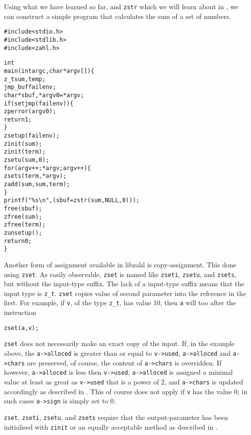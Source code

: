 Using what we have learned so far, and {\tt zstr}
which we will learn about in ,
we can construct a simple program that calculates the
sum of a set of numbers.

\begin{alltt}
   \textcolor{c}{#include <stdio.h>
   #include <stdlib.h>
   #include <zahl.h>}

   int
   main(int argc, char *argv[]) \{
       z_t sum, temp;
       \textcolor{c}{jmp_buf failenv;
       char *sbuf, *argv0 = *argv;
       if (setjmp(failenv)) \{
           zperror(argv0);
           return 1;
       \}
       zsetup(failenv);
       zinit(sum);
       zinit(term);}
       zsetu(sum, 0);
       for (argv++; *argv; argv++) \{
           zsets(term, *argv);
           zadd(sum, sum, term);
       \}
       \textcolor{c}{printf("\%s\textbackslash{}n", (sbuf = zstr(sum, NULL, 0)));
       free(sbuf);
       zfree(sum);
       zfree(term);
       zunsetup();
       return 0;}
   \}
\end{alltt}

Another form of assignment available in libzahl is
copy-assignment. This done using {\tt zset}. As
easily observable, {\tt zset} is named like
{\tt zseti}, {\tt zsetu}, and {\tt zsets}, but
without the input-type suffix. The lack of a
input-type suffix means that the input type is
{\tt z\_t}. {\tt zset} copies value of second
parameter into the reference in the first. For
example, if {\tt v}, of the type {\tt z\_t}, has
value 10, then {\tt a} will too after the instruction

\begin{alltt}
   zset(a, v);
\end{alltt}

{\tt zset} does not necessarily make an exact
copy of the input. If, in the example above, the
{\tt a->alloced} is greater than or equal to
{\tt v->used}, {\tt a->alloced} and {\tt a->chars}
are preserved, of course, the content of
{\tt a->chars} is overridden. If however,
{\tt a->alloced} is less then {\tt v->used},
{\tt a->alloced} is assigned a minimal value at
least as great as {\tt v->used} that is a power
of 2, and {\tt a->chars} is updated accordingly
as described in .
This of course does not apply if {\tt v} has the
value 0; in such cases {\tt a->sign} is simply
set to 0.

{\tt zset}, {\tt zseti}, {\tt zsetu}, and
{\tt zsets} require that the output-parameter
has been initialised with {\tt zinit} or an
equally acceptable method as described in
.

